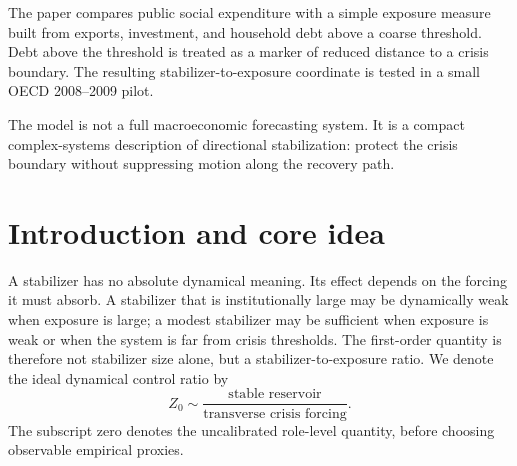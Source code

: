 \documentclass[11pt]{article}
\begin{document}
The paper compares public social expenditure with a simple exposure measure built from exports, investment, and household debt above a coarse threshold. Debt above the threshold is treated as a marker of reduced distance to a crisis boundary. The resulting stabilizer-to-exposure coordinate is tested in a small OECD 2008--2009 pilot.

The model is not a full macroeconomic forecasting system. It is a compact complex-systems description of directional stabilization: protect the crisis boundary without suppressing motion along the recovery path.

\section{Introduction and core idea}
A stabilizer has no absolute dynamical meaning. Its effect depends on the forcing it must absorb. A stabilizer that is institutionally large may be dynamically weak when exposure is large; a modest stabilizer may be sufficient when exposure is weak or when the system is far from crisis thresholds. The first-order quantity is therefore not stabilizer size alone, but a stabilizer-to-exposure ratio. We denote the ideal dynamical control ratio by
\[
Z_0\sim \frac{\text{stable reservoir}}{\text{transverse crisis forcing}}.
\]
The subscript zero denotes the uncalibrated role-level quantity, before choosing observable empirical proxies.
\end{document}
